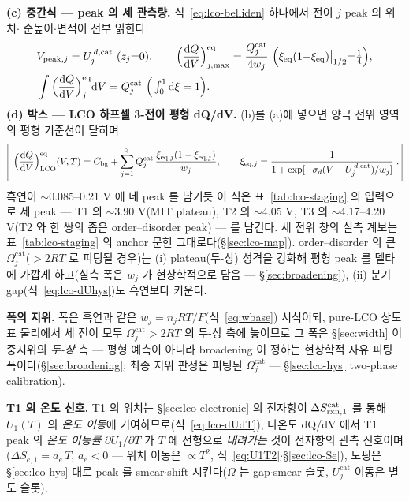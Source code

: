 \textbf{(c) 중간식 --- peak 의 세 관측량.} 식~\eqref{eq:lco-belliden} 하나에서 전이 $j$ peak 의 위치$\cdot$
순높이$\cdot$면적이 전부 읽힌다:
\begin{equation}
\begin{aligned}
&V_{\mathrm{peak},j}=U_j^{\,d,\mathrm{cat}}\ (z_j{=}0),\qquad
\Big(\frac{\dd Q}{\dd V}\Big)^{\eq}_{j,\max}=\frac{Q_j^\mathrm{cat}}{4w_j}\ \Big(\xi_\eq(1{-}\xi_\eq)\big|_{1/2}{=}\tfrac14\Big),\\
&\int\Big(\frac{\dd Q}{\dd V}\Big)^{\eq}_{j}\dd V=Q_j^\mathrm{cat}\ \Big(\textstyle\int_0^1\dd\xi=1\Big).
\end{aligned}
\label{eq:lco-peakobs}
\end{equation}
\textbf{(d) 박스 --- LCO 하프셀 3-전이 평형 dQ/dV.} (b)를 (a)에 넣으면 양극 전위 영역의 평형 기준선이 닫히며
\begin{equation}
\boxed{\;\Big(\frac{\mathrm{d} Q}{\mathrm{d} V}\Big)^{\mathrm{eq}}_\mathrm{LCO}(V,T)
=C_{\mathrm{bg}}+\sum_{j=1}^{3}Q_j^\mathrm{cat}\,
\frac{\xi_{\mathrm{eq},j}(1-\xi_{\mathrm{eq},j})}{w_j},
\qquad \xi_{\mathrm{eq},j}=\frac{1}{1+\exp[-\sigma_d(V-U_j^{\,d,\mathrm{cat}})/w_j]}\;.}
\label{eq:lco-eqpeak}
\end{equation}
흑연이 $\sim$0.085--0.21 V 에 네 peak 를 남기듯 이 식은 표~\ref{tab:lco-staging} 의 입력으로 세 peak ---
T1 의 $\sim$3.90 V(MIT plateau), T2 의 $\sim$4.05 V, T3 의 $\sim$4.17--4.20 V(T2 와 한 쌍의 좁은
order--disorder peak) --- 를 남긴다. 세 전위 창의 실측 계보는 표~\ref{tab:lco-staging} 의 anchor
문헌\cite{xia2007,reynier2004,motohashi2009} 그대로다(\S\ref{sec:lco-map}). order--disorder 의 큰 $\Omega_j^\mathrm{cat}$($>2RT$ 로 피팅될 경우)는
(i) plateau(두-상) 성격을 강화해 평형 peak 를 델타에 가깝게 하고(실측 폭은 $w_j$ 가 현상학적으로 담음 ---
\S\ref{sec:broadening}), (ii) 분기 gap(식~\eqref{eq:lco-dUhys})도 흑연보다 키운다.

\textbf{폭의 지위.} 폭은 흑연과 같은 $w_j=n_jRT/F$(식~\eqref{eq:wbase}) 서식이되, pure-LCO 상도표 물리에서 세
전이 모두 $\Omega_j^\mathrm{cat}>2RT$ 의 두-상 측에 놓이므로 그 폭은 \S\ref{sec:width} 이중지위의
\emph{두-상} 측 --- 평형 예측이 아니라 broadening 이 정하는 현상학적 자유 피팅 폭이다(\S\ref{sec:broadening};
최종 지위 판정은 피팅된 $\Omega_j^\mathrm{cat}$ --- \S\ref{sec:lco-hys} two-phase calibration).

\textbf{T1 의 온도 신호.} T1 의 위치는 \S\ref{sec:lco-electronic} 의 전자항이 $\Delta S_{\mathrm{rxn},1}^\mathrm{cat}$ 를 통해 $U_1(T)$ 의
\emph{온도 이동}에 기여하므로(식~\eqref{eq:lco-dUdT}), 다온도 dQ/dV 에서 T1 peak 의 \emph{온도 이동률}
$\partial U_1/\partial T$ 가 $T$ 에 선형으로 \emph{내려가는} 것이 전자항의 관측 신호이며($\Delta S_{e,1}=a_e\,T$, $a_e<0$ ---
위치 이동은 $\propto T^2$, 식~\eqref{eq:U1T2}$\cdot$\S\ref{sec:lco-Se}), 도핑은 \S\ref{sec:lco-hys} 대로 peak 를 smear$\cdot$shift 시킨다($\Omega$ 는
gap$\cdot$smear 슬롯, $U_j^\mathrm{cat}$ 이동은 별도 슬롯).


